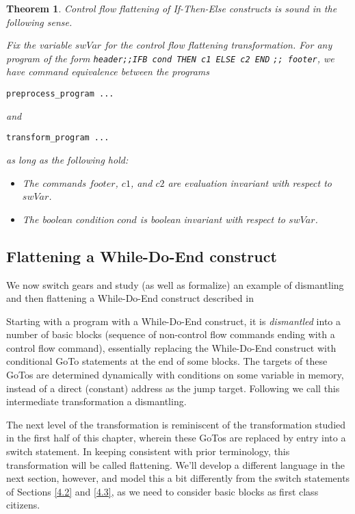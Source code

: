 \documentclass[compsoc,conference,a4paper,10pt,times]{IEEEtran}
\newtheorem{theorem}{Theorem}[section]
\begin{document}
\begin{theorem}\label{maintheo}
Control flow flattening of If-Then-Else constructs is sound in the following sense.  
\par Fix the variable $swVar$ for the control flow flattening transformation.  
For any program of the form \verb$header;;IFB cond THEN c1 ELSE c2 END$ \verb$;; footer$, we have command equivalence between the programs
\begin{verbatim}preprocess_program ...\end{verbatim}
and
\begin{verbatim}transform_program ...\end{verbatim}
as long as the following hold:
\begin{itemize}
    \item The commands $footer$, $c1$, and $c2$ are evaluation invariant with respect to $swVar$.
    \item The boolean condition $cond$ is boolean invariant with respect to $swVar$.
\end{itemize}
\end{theorem}

\subsection{Flattening a While-Do-End construct}\label{4.4}
We now switch gears and study (as well as formalize) an example of dismantling and then flattening a While-Do-End construct described in \cite{Wang}

Starting with a program with a While-Do-End construct, it is \emph{dismantled} into a number of basic blocks (sequence of non-control flow commands ending with a control flow command), essentially replacing the While-Do-End construct with conditional GoTo statements at the end of some blocks.  The targets of these GoTos are determined dynamically with conditions on some variable in memory, instead of a direct (constant) address as the jump target. Following \cite{Wang} we call this intermediate transformation a dismantling.
\par The next level of the transformation is reminiscent of the transformation studied in the first half of this chapter, wherein these GoTos are replaced by entry into a switch statement.  In keeping consistent with prior terminology, this transformation will be called flattening.  We'll develop a different language in the next section, however, and model this a bit differently from the switch statements of Sections \ref{4.2} and \ref{4.3}, as we need to consider basic blocks as first class citizens.
\end{document}
